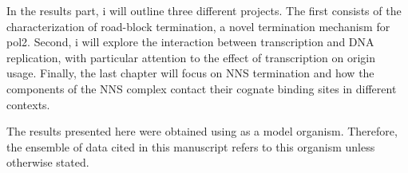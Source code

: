In the results part, i will outline three different projects. The first consists of the characterization of road-block termination, a novel termination mechanism for \gls{pol2}. Second, i will explore the interaction between transcription and DNA replication, with particular attention to the effect of transcription on origin usage. Finally, the last chapter will focus on NNS termination and how the components of the NNS complex contact their cognate binding sites in different contexts.

The results presented here were obtained using \cer{} as a model organism.
Therefore, the ensemble of data cited in this manuscript refers to this organism unless otherwise stated.







